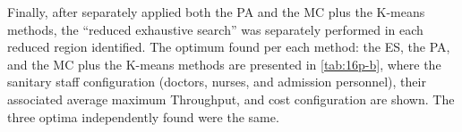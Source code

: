 Finally, after separately applied both the PA and the MC plus the
K-means methods, the \textquotedblleft{}reduced exhaustive search\textquotedblright{}
was separately performed in each reduced region identified. The optimum
found per each method: the ES, the PA, and the MC plus the K-means
methods are presented in \ref{tab:16p-b}, where the sanitary staff
configuration (doctors, nurses, and admission personnel), their associated
average maximum Throughput, and cost configuration are shown. The
three optima independently found were the same.

